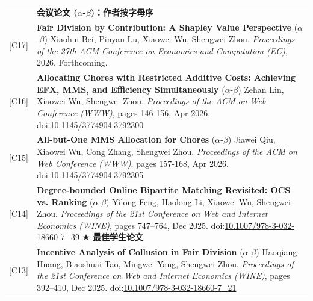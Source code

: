 \documentclass[UTF8, fontset=none, letterpaper, 11pt]{ctexart}
\newcommand{\headingfont}{\Large\bfseries\color{OliveGreen}}
\newenvironment{SectionTable}[1]{
  \renewcommand*{\arraystretch}{1.2}
  \setlength{\tabcolsep}{10pt}
  \begin{longtable}{Rp{5.2in}} & #1 \\}
{\end{longtable}\vspace{-1cm}}
\begin{document}
\begin{SectionTable}{\headingfont 会议论文 \; \small\color{black}  ($\alpha$-$\beta$)：作者按字母序}
{[C17]} &
\textbf{Fair Division by Contribution: A Shapley Value Perspective} \newline
($\alpha$-$\beta$) Xiaohui Bei, Pinyan Lu, Xiaowei Wu, Shengwei Zhou.  \newline
\textit{Proceedings of the 27th ACM Conference on Economics and Computation (EC)}, 2026, Forthcoming.\\

{[C16]} &
\textbf{Allocating Chores with Restricted Additive Costs: Achieving EFX, MMS, and Efficiency Simultaneously} \newline
($\alpha$-$\beta$) Zehan Lin, Xiaowei Wu, Shengwei Zhou.  \newline
\textit{Proceedings of the ACM on Web Conference (WWW)}, pages 146-156, Apr 2026. doi:\href{https://doi.org/10.1145/3774904.3792300}{10.1145/3774904.3792300}\\

{[C15]} &
\textbf{All-but-One MMS Allocation for Chores} \newline
($\alpha$-$\beta$) Jiawei Qiu, Xiaowei Wu, Cong Zhang, Shengwei Zhou.  \newline
\textit{Proceedings of the ACM on Web Conference (WWW)}, pages 157-168, Apr 2026. doi:\href{https://doi.org/10.1145/3774904.3792305}{10.1145/3774904.3792305} \\

{[C14]} &
\textbf{Degree-bounded Online Bipartite Matching Revisited: OCS vs. Ranking} \newline
($\alpha$-$\beta$) Yilong Feng, Haolong Li, Xiaowei Wu, Shengwei Zhou. \newline
\textit{Proceedings of the 21st Conference on Web and Internet Economics (WINE)}, pages 747--764, Dec 2025.
doi:\href{https://doi.org/10.1007/978-3-032-18660-7_39}{10.1007/978-3-032-18660-7\_39} $\bigstar$ \textbf{最佳学生论文} \\

{[C13]} &
\textbf{Incentive Analysis of Collusion in Fair Division} \newline
($\alpha$-$\beta$) Haoqiang Huang, Biaoshuai Tao, Mingwei Yang, Shengwei Zhou. \newline
\textit{Proceedings of the 21st Conference on Web and Internet Economics (WINE)}, pages 392--410, Dec 2025.
doi:\href{https://doi.org/10.1007/978-3-032-18660-7_21}{10.1007/978-3-032-18660-7\_21}\\


\end{SectionTable}
\end{document}
